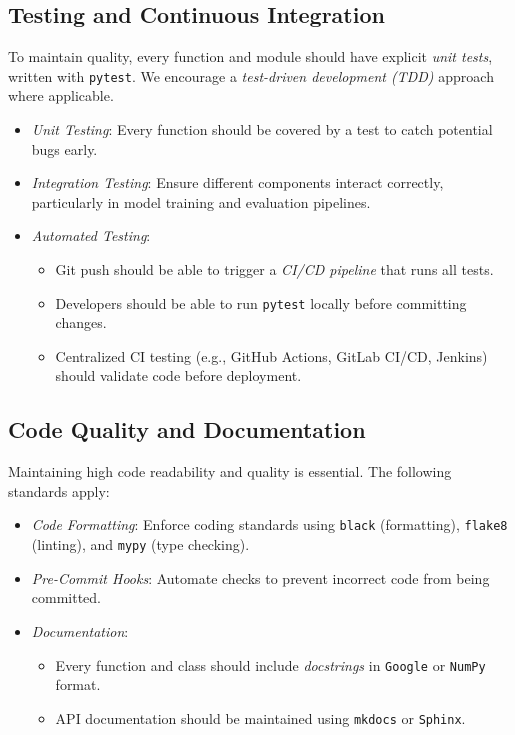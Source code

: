 \subsection{Testing and Continuous Integration}

To maintain quality, every function and module should have explicit \emph{unit tests}, written with \texttt{pytest}. We encourage a \emph{test-driven development (TDD)} approach where applicable.

\begin{itemize}[itemsep=1pt,topsep=3pt]
    \item \emph{Unit Testing}: Every function should be covered by a test to catch potential bugs early.
    \item \emph{Integration Testing}: Ensure different components interact correctly, particularly in model training and evaluation pipelines.
    \item \emph{Automated Testing}:
    \begin{itemize}[itemsep=1pt,topsep=3pt]
        \item Git push should be able to trigger a \emph{CI/CD pipeline} that runs all tests.
        \item Developers should be able to run \texttt{pytest} locally before committing changes.
        \item Centralized CI testing (e.g., GitHub Actions, GitLab CI/CD, Jenkins) should validate code before deployment.
    \end{itemize}
\end{itemize}

\subsection{Code Quality and Documentation}
Maintaining high code readability and quality is essential. The following standards apply:

\begin{itemize}[itemsep=1pt,topsep=3pt]
    \item \emph{Code Formatting}: Enforce coding standards using \texttt{black} (formatting), \texttt{flake8} (linting), and \texttt{mypy} (type checking).
    \item \emph{Pre-Commit Hooks}: Automate checks to prevent incorrect code from being committed.
    \item \emph{Documentation}:
    \begin{itemize}[itemsep=1pt,topsep=3pt]
        \item Every function and class should include \emph{docstrings} in \texttt{Google} or \texttt{NumPy} format.
        \item API documentation should be maintained using \texttt{mkdocs} or \texttt{Sphinx}.
    \end{itemize}
\end{itemize}

